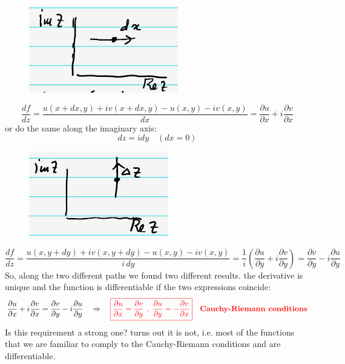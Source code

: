 \documentclass{article}
\begin{document}
\newpage
\begin{figure}[h]
    \centering
    \includegraphics[width=0.25\linewidth]{fig9.png}
\end{figure}
\begin{equation}
    \frac{d f}{d z}
= \frac{u(x + dx, y) + i v(x + dx, y) - u(x, y) - i v(x, y)}{dx}
= \frac{\partial u}{\partial x} + i \frac{\partial v}{\partial x}
\end{equation}
or do the same along the imaginary axis:
\begin{equation}
    dz=idy \quad (dx=0)
\end{equation}
\begin{figure}[h]
    \centering
    \includegraphics[width=0.25\linewidth]{fig10.png}
\end{figure}
\begin{equation}
    \frac{d f}{d z}
= \frac{u(x, y + dy) + i v(x, y + dy) - u(x, y) - i v(x, y)}{i \, dy}
= \frac{1}{i} \left( \frac{\partial u}{\partial y} + i \frac{\partial v}{\partial y} \right)
= \frac{\partial v}{\partial y} - i \frac{\partial u}{\partial y}
\end{equation}
So, along the two different paths we found two different results. the derivative is unique and the function is differentiable if the two expressions coincide:
\begin{equation}
    \frac{\partial u}{\partial x} + i \frac{\partial v}{\partial x}
= \frac{\partial v}{\partial y} - i \frac{\partial u}{\partial y} \quad \Rightarrow \quad \color{red} \boxed{\frac{\partial u}{\partial x} = \frac{\partial v}{\partial y} \ , \ \frac{\partial u}{\partial y} = -\frac{\partial v}{\partial x}} \quad \textbf{Cauchy-Riemann conditions} \color{black}
\end{equation}
Is this requirement a strong one? turns out it is not, i.e. most of the functions that we are familiar to comply to the Cauchy-Riemann conditions and are differentiable.
\end{document}
